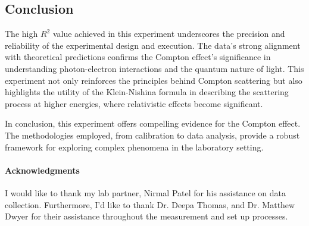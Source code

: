 \documentclass[10pt,letterpaper,onecolumn]{article}
\begin{document}
\subsection*{Conclusion}
The high \(R^2\) value achieved in this experiment underscores the precision and reliability of the experimental design and execution. The data's strong alignment with theoretical predictions confirms the Compton effect's significance in understanding photon-electron interactions and the quantum nature of light. This experiment not only reinforces the principles behind Compton scattering but also highlights the utility of the Klein-Nishina formula in describing the scattering process at higher energies, where relativistic effects become significant.

In conclusion, this experiment offers compelling evidence for the Compton effect. The methodologies employed, from calibration to data analysis, provide a robust framework for exploring complex phenomena in the laboratory setting.


\paragraph*{Acknowledgments}
I would like to thank my lab partner, Nirmal Patel for his assistance on data collection. Furthermore, I'd like to thank Dr. Deepa Thomas, and Dr. Matthew Dwyer for their assistance throughout the measurement and set up processes. 
\newpage
 
 
\end{document}
